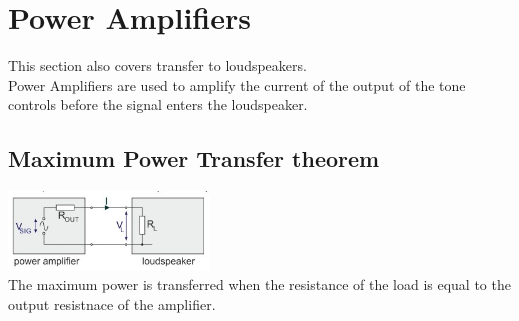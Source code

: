 \documentclass[a4paper, 11pt, twocolumn]{article}
\begin{document}
    \section{Power Amplifiers}
    This section also covers transfer to loudspeakers.\\
    Power Amplifiers are used to amplify the current of the output of the tone controls before the signal enters the loudspeaker.
    \subsection{Maximum Power Transfer theorem}
    \includegraphics[width=0.4\textwidth]{paToLs.jpg}\\
    The maximum power is transferred when the resistance of the load is equal to the output resistnace of the amplifier.
\end{document}
